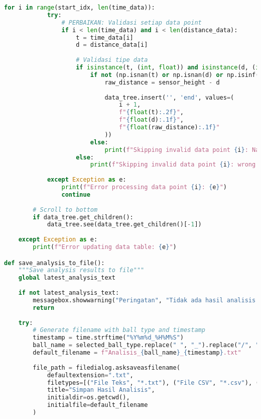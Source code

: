 \begin{itemize}
\begin{scriptsize}
\begin{lstlisting}[language=python]
        for i in range(start_idx, len(time_data)):
            try:
                # PERBAIKAN: Validasi setiap data point
                if i < len(time_data) and i < len(distance_data):
                    t = time_data[i]
                    d = distance_data[i]
                    
                    # Validasi tipe data
                    if isinstance(t, (int, float)) and isinstance(d, (int, float)):
                        if not (np.isnan(t) or np.isnan(d) or np.isinf(t) or np.isinf(d)):
                            raw_distance = sensor_height - d
                            
                            data_tree.insert('', 'end', values=(
                                i + 1,
                                f"{float(t):.2f}",
                                f"{float(d):.1f}",
                                f"{float(raw_distance):.1f}"
                            ))
                        else:
                            print(f"Skipping invalid data point {i}: NaN or Inf values")
                    else:
                        print(f"Skipping invalid data point {i}: wrong data type")
                        
            except Exception as e:
                print(f"Error processing data point {i}: {e}")
                continue
        
        # Scroll to bottom
        if data_tree.get_children():
            data_tree.see(data_tree.get_children()[-1])
            
    except Exception as e:
        print(f"Error updating data table: {e}")

def save_analysis_to_file():
    """Save analysis results to file"""
    global latest_analysis_text
    
    if not latest_analysis_text:
        messagebox.showwarning("Peringatan", "Tidak ada hasil analisis untuk disimpan.\nSilakan hitung koefisien restitusi terlebih dahulu.")
        return
    
    try:
        # Generate filename with ball type and timestamp
        timestamp = time.strftime("%Y%m%d_%H%M%S")
        ball_name = selected_ball_type.replace(" ", "_").replace("/", "_")  # PERBAIKAN: Hapus karakter invalid
        default_filename = f"Analisis_{ball_name}_{timestamp}.txt"
        
        file_path = filedialog.asksaveasfilename(
            defaultextension=".txt",
            filetypes=[("File Teks", "*.txt"), ("File CSV", "*.csv"), ("Semua file", "*.*")],  # PERBAIKAN: Tambah format CSV
            title="Simpan Hasil Analisis",
            initialdir=os.getcwd(),
            initialfile=default_filename
        )
        

\end{lstlisting}
\end{scriptsize}
\end{itemize}
